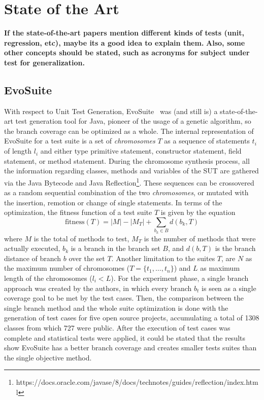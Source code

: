 \documentclass[%
  chapterprefix=false,%
  open=right,%
  twoside=true,%
  paper=a4,%
  logofile={Figures/logo.png},%
  thesistype=master,%
  UKenglish,%
]{se2thesis}
\begin{document}
\chapter{State of the Art}

\textbf{If the state-of-the-art papers mention different kinds of tests (unit, regression, etc), maybe its a good idea to explain them.}
\textbf{Also, some other concepts should be stated, such as acronyms for subject under test for generalization.}

\section{EvoSuite}
With respect to Unit Test Generation, EvoSuite~\cite{DBLP:conf/qsic/FraserA11} was (and still is) a state-of-the-art test generation tool for Java, pioneer of the usage of a genetic algorithm, so the branch coverage can be optimized as a whole.
The internal representation of EvoSuite for a test suite is a set of \textit{chromosomes} $T$ as a sequence of statements $t_i$ of length $l_i$ and either type primitive statement, constructor statement, field statement, or method statement.
During the chromosome synthesis process, all the information regarding classes, methods and variables of the SUT are gathered via the Java Bytecode and Java Reflection\footnote{https://docs.oracle.com/javase/8/docs/technotes/guides/reflection/index.html}.
These sequences can be crossovered as a random sequential combination of the two \textit{chromosomes}, or mutated with the insertion, remotion or change of single statements.
In terms of the optimization, the fitness function of a test suite $T$ is given by the equation
\[ \text{fitness}(T) = |M| - |M_T| + \sum_{b_k \in B} d(b_k, T) \]
where $M$ is the total of methods to test, $M_T$ is the number of methods that were actually executed, $b_k$ is a branch in the branch set $B$, and $d(b, T)$ is the branch distance of branch $b$ over the set $T$.
Another limitation to the suites $T$, are $N$ as the maximum number of chromosomes ($T = \{t_1, \dots , t_n\}$) and $L$ as maximum length of the chromosomes ($l_i < L$).
For the experiment phase, a single branch approach was created by the authors, in which every branch $b_t$ is seen as a single coverage goal to be met by the test cases.
Then, the comparison between the single branch method and the whole suite optimization is done with the generation of test cases for five open source projects, accumulating a total of 1308 classes from which 727 were public.
After the execution of test cases was complete and statistical tests were applied, it could be stated that the results show EvoSuite has a better branch coverage and creates smaller tests suites than the single objective method.
\end{document}
